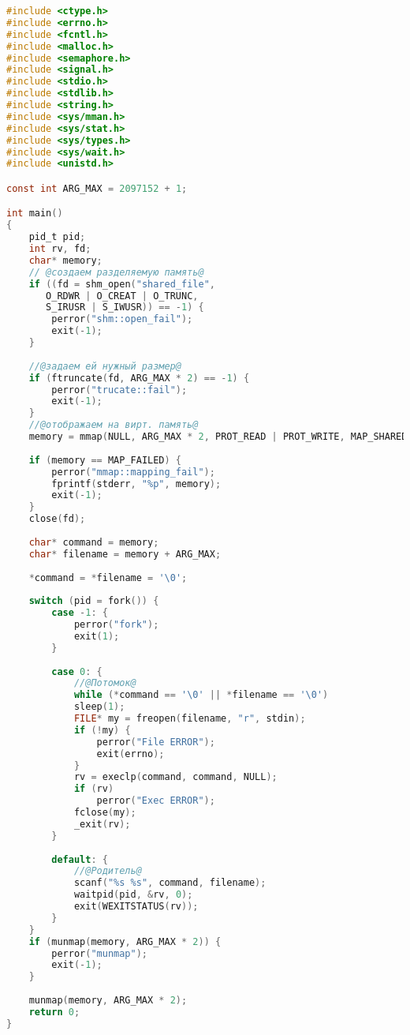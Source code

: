 \documentclass[12pt]{article}
\begin{document}
{\scriptsize
\begin{lstlisting}[language=c,escapechar=@]
#include <ctype.h>
#include <errno.h>
#include <fcntl.h>
#include <malloc.h>
#include <semaphore.h>
#include <signal.h>
#include <stdio.h>
#include <stdlib.h>
#include <string.h>
#include <sys/mman.h>
#include <sys/stat.h>
#include <sys/types.h>
#include <sys/wait.h>
#include <unistd.h>

const int ARG_MAX = 2097152 + 1;

int main()
{
    pid_t pid;
    int rv, fd;
    char* memory;
    // @создаем разделяемую память@
    if ((fd = shm_open("shared_file", 
       O_RDWR | O_CREAT | O_TRUNC, 
       S_IRUSR | S_IWUSR)) == -1) {
        perror("shm::open_fail");
        exit(-1);
    }
    
    //@задаем ей нужный размер@
    if (ftruncate(fd, ARG_MAX * 2) == -1) {
        perror("trucate::fail");
        exit(-1);
    }
    //@отображаем на вирт. память@
    memory = mmap(NULL, ARG_MAX * 2, PROT_READ | PROT_WRITE, MAP_SHARED, fd, 0); 
    
    if (memory == MAP_FAILED) {
        perror("mmap::mapping_fail");
        fprintf(stderr, "%p", memory);
        exit(-1);
    }
    close(fd);
    
    char* command = memory;
    char* filename = memory + ARG_MAX;
    
    *command = *filename = '\0';
    
    switch (pid = fork()) {
        case -1: {
            perror("fork");
            exit(1);
        }
        
        case 0: {
            //@Потомок@
            while (*command == '\0' || *filename == '\0')
            sleep(1);
            FILE* my = freopen(filename, "r", stdin);
            if (!my) {
                perror("File ERROR");
                exit(errno);
            }
            rv = execlp(command, command, NULL);
            if (rv)
                perror("Exec ERROR");
            fclose(my);
            _exit(rv);
        }
        
        default: {
            //@Родитель@
            scanf("%s %s", command, filename);
            waitpid(pid, &rv, 0);
            exit(WEXITSTATUS(rv));
        }
    }
    if (munmap(memory, ARG_MAX * 2)) {
        perror("munmap");
        exit(-1);
    }
    
    munmap(memory, ARG_MAX * 2);
    return 0;
}
\end{lstlisting}
}
\end{document}
